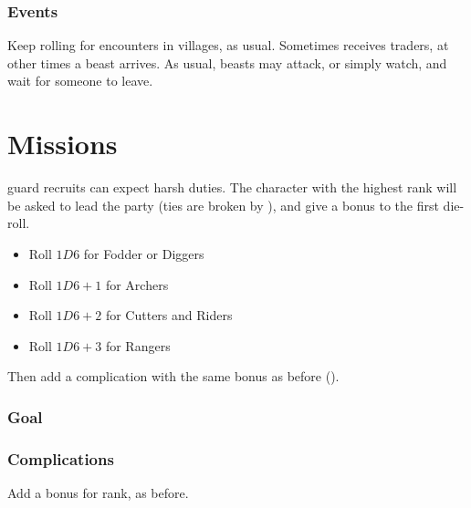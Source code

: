 \begin{multicols}{2}
\encVillageFeatures

\subsubsection{ Events}

Keep rolling for encounters in \glspl{village}, as usual.
Sometimes  receives traders, at other times a beast arrives.
As usual, beasts may attack, or simply watch, and wait for someone to leave.

\encVillageEvent

\end{multicols}

\section{Missions}
\label{NGmissions}

\begin{multicols}{2}

\noindent
\Gls{guard} recruits can expect harsh duties.
The character with the highest rank will be asked to lead the party (ties are broken by ), and give a bonus to the first die-roll.

\begin{itemize}
  \item
  Roll $1D6$ for Fodder or Diggers
  \item
  Roll $1D6+1$ for Archers
  \item
  Roll $1D6+2$ for Cutters and Riders
  \item
  Roll $1D6+3$ for Rangers
\end{itemize}

Then add a complication with the same bonus as before ().

\subsubsection{Goal}

\ngMissions

\subsubsection{Complications}

Add a bonus for rank, as before.

\missionComplications

\end{multicols}
